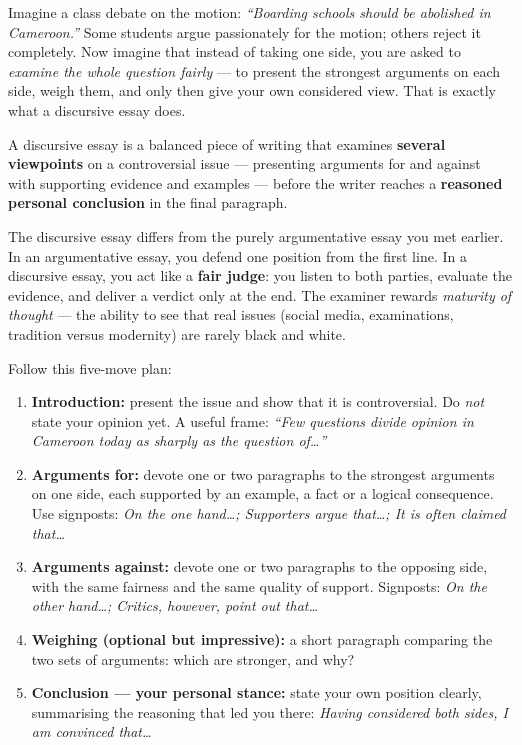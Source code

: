\documentclass[11pt]{article}
\newcommand{\cle}[1]{{\popxbold\color{popdark}#1}}
\begin{document}
Imagine a class debate on the motion: \emph{``Boarding schools should be abolished in Cameroon.''} Some students argue passionately for the motion; others reject it completely. Now imagine that instead of taking one side, you are asked to \emph{examine the whole question fairly} — to present the strongest arguments on each side, weigh them, and only then give your own considered view. That is exactly what a discursive essay does.

\begin{definition}
A \cle{discursive essay} is a balanced piece of writing that examines \textbf{several viewpoints} on a controversial issue — presenting arguments for and against with supporting evidence and examples — before the writer reaches a \textbf{reasoned personal conclusion} in the final paragraph.
\end{definition}

The discursive essay differs from the purely argumentative essay you met earlier. In an argumentative essay, you defend one position from the first line. In a discursive essay, you act like a \textbf{fair judge}: you listen to both parties, evaluate the evidence, and deliver a verdict only at the end. The examiner rewards \emph{maturity of thought} — the ability to see that real issues (social media, examinations, tradition versus modernity) are rarely black and white.

\begin{methode}
Follow this five-move plan:
\begin{enumerate}
\item \textbf{Introduction:} present the issue and show that it is controversial. Do \emph{not} state your opinion yet. A useful frame: \emph{``Few questions divide opinion in Cameroon today as sharply as the question of\ldots''}
\item \textbf{Arguments for:} devote one or two paragraphs to the strongest arguments on one side, each supported by an example, a fact or a logical consequence. Use signposts: \emph{On the one hand\ldots; Supporters argue that\ldots; It is often claimed that\ldots}
\item \textbf{Arguments against:} devote one or two paragraphs to the opposing side, with the same fairness and the same quality of support. Signposts: \emph{On the other hand\ldots; Critics, however, point out that\ldots}
\item \textbf{Weighing (optional but impressive):} a short paragraph comparing the two sets of arguments: which are stronger, and why?
\item \textbf{Conclusion — your personal stance:} state your own position clearly, summarising the reasoning that led you there: \emph{Having considered both sides, I am convinced that\ldots}
\end{enumerate}
\end{methode}
\end{document}
